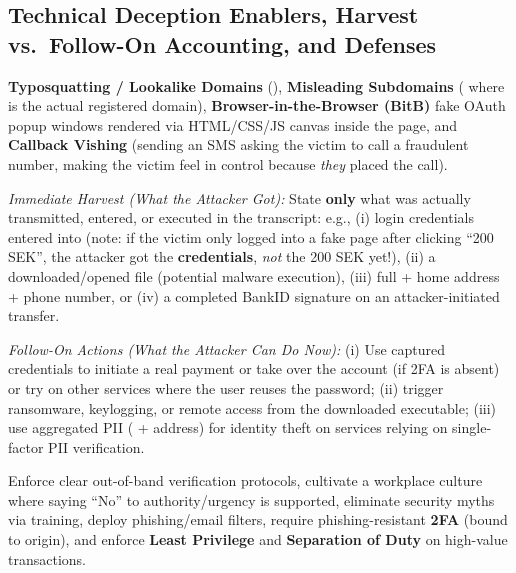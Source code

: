\subsection{Technical Deception Enablers, Harvest vs.\ Follow-On Accounting, and Defenses}
\begin{compactitem}
  \item {} \textbf{Typosquatting / Lookalike Domains} (), \textbf{Misleading Subdomains} ( where  is the actual registered domain), \textbf{Browser-in-the-Browser (BitB)} fake OAuth popup windows rendered via HTML/CSS/JS canvas inside the page, and \textbf{Callback Vishing} (sending an SMS asking the victim to call a fraudulent number, making the victim feel in control because \emph{they} placed the call).
  \item {}
  \begin{compactitem}
    \item \emph{Immediate Harvest (What the Attacker Got):} State \textbf{only} what was actually transmitted, entered, or executed in the transcript: e.g., (i) login credentials entered into  (note: if the victim only logged into a fake page after clicking ``200 SEK'', the attacker got the \textbf{credentials}, \emph{not} the 200 SEK yet!), (ii) a downloaded/opened file (potential malware execution), (iii) full  + home address + phone number, or (iv) a completed BankID signature on an attacker-initiated transfer.
    \item \emph{Follow-On Actions (What the Attacker Can Do Now):} (i) Use captured credentials to initiate a real payment or take over the account (if 2FA is absent) or try  on other services where the user reuses the password; (ii) trigger ransomware, keylogging, or remote access from the downloaded executable; (iii) use aggregated PII ( + address) for identity theft on services relying on single-factor PII verification.
  \end{compactitem}
  \item {} Enforce clear out-of-band verification protocols, cultivate a workplace culture where saying ``No'' to authority/urgency is supported, eliminate security myths via training, deploy phishing/email filters, require phishing-resistant \textbf{2FA} (bound to origin), and enforce \textbf{Least Privilege} and \textbf{Separation of Duty} on high-value transactions.
\end{compactitem}

